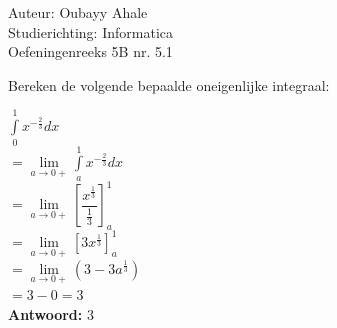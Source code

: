 \documentclass[a4paper]{article}
\newcommand{\dint}{\displaystyle\int}
\newcommand{\llim}{\lim\limits}
\begin{document}
  
\noindent \large Auteur: Oubayy Ahale         \\
\noindent \large Studierichting: Informatica  \\
\noindent \large Oefeningenreeks 5B nr. 5.1   \\

\medskip

\normalsize

Bereken de volgende bepaalde oneigenlijke integraal:

$ \dint\limits_{0}^{1} x^{-\tfrac{2}{3}} dx  $\\

$ = \llim_{a \rightarrow 0+} \dint\limits_{a}^{1} x^{-\tfrac{2}{3}} dx $\\

$ = \llim_{a \rightarrow 0+} \left[ \dfrac{x^{\tfrac{1}{3}}}{\tfrac{1}{3}} \right]_{a}^{1} $\\

$ = \llim_{a \rightarrow 0+} \left[ 3x^{\tfrac{1}{3}} \right]_{a}^{1}  $\\

$ = \llim_{a \rightarrow 0+} \left( 3 - 3a^{\tfrac{1}{3}} \right)      $\\

$ = 3 - 0 = 3                 $\\

\textbf{Antwoord:} $\boxed{3} $\\
\end{document}
